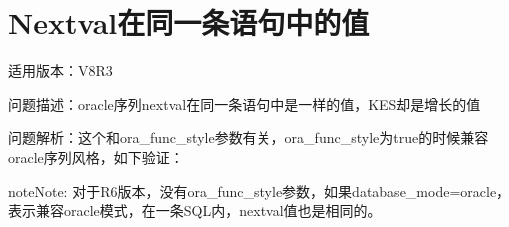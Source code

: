 \documentclass[letterpaper,10pt,english]{sphinxmanual}
\begin{document}
\section{Nextval在同一条语句中的值}
\label{\detokenize{sql:nextval}}
适用版本：V8R3

问题描述：oracle序列nextval在同一条语句中是一样的值，KES却是增长的值

问题解析：这个和ora\_func\_style参数有关，ora\_func\_style为true的时候兼容oracle序列风格，如下验证：

\begin{sphinxVerbatim}[commandchars=\\\{\}]
 

   
           
 

   
           
 
\end{sphinxVerbatim}

\begin{sphinxadmonition}{note}{Note:}
对于R6版本，没有ora\_func\_style参数，如果database\_mode=oracle，表示兼容oracle模式，在一条SQL内，nextval值也是相同的。
\end{sphinxadmonition}
\end{document}
